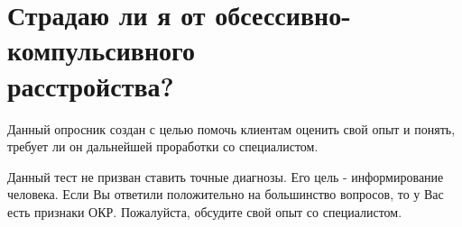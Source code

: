 \documentclass{survey}
\begin{document}
\section*{\huge{Страдаю ли я от обсессивно-компульсивного \\ расстройства?}}

\begin{flushleft}
Данный опросник создан с целью помочь клиентам оценить свой опыт и понять, требует ли он дальнейшей проработки со специалистом.
\end{flushleft}







\begin{flushleft}
Данный тест не призван ставить точные диагнозы. Его цель - информирование человека. Если Вы ответили положительно на большинство вопросов, то у Вас есть признаки ОКР. Пожалуйста, обсудите свой опыт со специалистом.
\end{flushleft}
\end{document}
